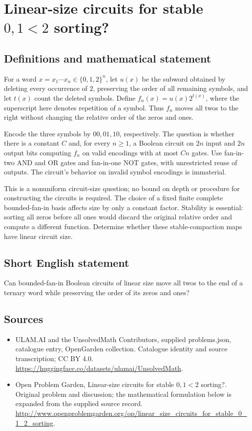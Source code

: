 \documentclass[11pt,a4paper]{article}
\begin{document}
\section*{Linear-size circuits for stable $0,1 < 2$ sorting?}\label{statement}

\subsection{Definitions and mathematical statement}
For a word $x=x_1\cdots x_n\in\{0,1,2\}^n$, let $u(x)$ be the
subword obtained by deleting every occurrence of $2$, preserving
the order of all remaining symbols, and let $t(x)$ count the deleted
symbols. Define $f_n(x)=u(x)2^{t(x)}$, where the superscript here
denotes repetition of a symbol. Thus $f_n$ moves all twos to the
right without changing the relative order of the zeros and ones.

Encode the three symbols by $00,01,10$, respectively. The question
is whether there is a constant $C$ and, for every $n\ge1$, a Boolean
circuit on $2n$ input and $2n$ output bits computing $f_n$ on valid
encodings with at most $Cn$ gates. Use fan-in-two AND and OR gates
and fan-in-one NOT gates, with unrestricted reuse of outputs.
The circuit's behavior on invalid symbol encodings is immaterial.

This is a nonuniform circuit-size question; no bound on depth or
procedure for constructing the circuits is required. The choice of
a fixed finite complete bounded-fan-in basis affects size by only
a constant factor. Stability is essential: sorting all zeros before
all ones would discard the original relative order and compute a
different function. Determine whether these stable-compaction maps
have linear circuit size.
\subsection{Short English statement}
Can bounded-fan-in Boolean circuits of linear size move all twos to the end of a ternary word while preserving the order of its zeros and ones?
\subsection{Sources}
\begin{itemize}
\item[S1] ULAM.AI and the UnsolvedMath Contributors, supplied problems.json, catalogue entry, OpenGarden collection. Catalogue identity and source transcription; CC BY 4.0.
\url{https://huggingface.co/datasets/ulamai/UnsolvedMath}.
\item[S2] Open Problem Garden, Linear-size circuits for stable $0,1 < 2$ sorting?. Original problem and discussion; the mathematical formulation below is expanded from the supplied source record.
\url{http://www.openproblemgarden.org/op/linear_size_circuits_for_stable_0_1_2_sorting}.
\end{itemize}
\end{document}
